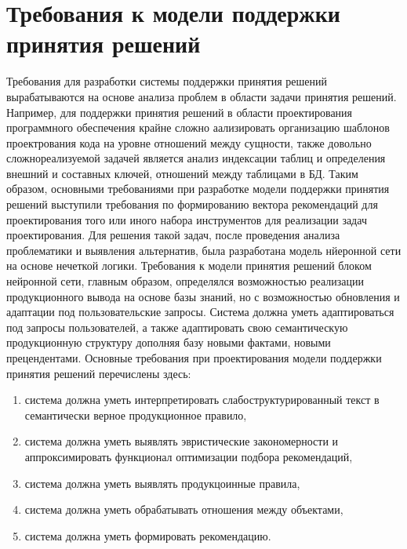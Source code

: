 \section{Требования к модели поддержки принятия решений}\label{sec:ch3/sec2}
Требования для разработки системы поддержки принятия решений вырабатываются на основе анализа проблем в области задачи принятия решений. Например, для поддержки принятия решений в области проектирования программного обеспечения крайне сложно аализировать организацию шаблонов проектрования кода на уровне отношений между сущности, также довольно сложнореализуемой задачей является анализ индексации таблиц и определения внешний и составных ключей, отношений между таблицами в БД.
Таким образом, основными требованиями при разработке модели поддержки принятия решений выступили требования по формированию вектора рекомендаций для проектирования того или иного набора инструментов для реализации задач проектирования. Для решения такой задач, после проведения анализа проблематики и выявления альтернатив, была разработана модель нйеронной сети на основе нечеткой логики. Требования к модели принятия решений блоком нейронной сети, главным образом, определялся возможностью реализации продукционного вывода на основе базы знаний, но с возможностью обновления и адаптации под пользовательские запросы. Система должна уметь адаптироваться под запросы пользователей, а также адаптировать свою семантическую продукционную структуру дополняя базу новыми фактами, новыми прецендентами.
Основные требования при проектирования модели поддержки принятия решений перечислены здесь:
\begin{enumerate}
	\item система должна уметь интерпретировать слабоструктурированный текст в семантически верное продукционное правило,
	\item система должна уметь выявлять эвристические закономерности и аппроксимировать функционал оптимизации подбора рекомендаций,
	\item система должна уметь выявлять продукцоинные правила,
	\item система должна уметь обрабатывать отношения между объектами,
	\item система должна уметь формировать рекомендацию.
\end{enumerate}


